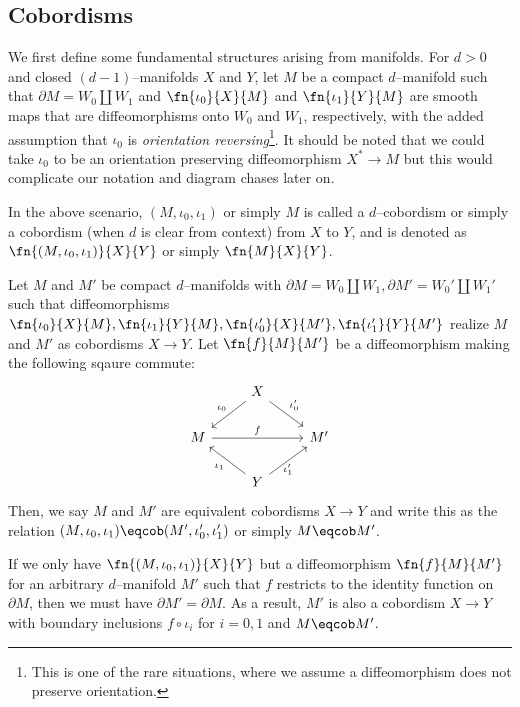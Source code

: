
\subsection{Cobordisms}

We first define some fundamental structures arising from manifolds. For $d > 0$
and closed $(d - 1)$--manifolds $X$ and $Y$, let $M$ be a compact $d$--manifold
such that $\partial M = W_0 \amalg W_1$ and $\fn{\iota_0}{X}{M}$ and
$\fn{\iota_1}{Y}{M}$ are smooth maps that are diffeomorphisms onto $W_0$ and
$W_1$, respectively, with the added assumption that $\iota_0$ is
\textit{orientation reversing}\footnote{This is one of the rare situations,
where we assume a diffeomorphism does not preserve orientation.}. It should be
noted that we could take $\iota_0$ to be an orientation preserving
diffeomorphism $X^* \to M$ but this would complicate our notation and diagram
chases later on.

\begin{defn}[{$d$}--Cobordism]
In the above scenario, $(M, \iota_0, \iota_1)$ or simply $M$ is called a
$d$--cobordism or simply a cobordism (when $d$ is clear from context) from $X$
to $Y$, and is denoted as $\fn{(M, \iota_0, \iota_1)}{X}{Y}$ or simply
$\fn{M}{X}{Y}$.
\end{defn}

\begin{defn}\label{cob:equiv}
Let $M$ and $M'$ be compact $d$--manifolds with $\partial M = W_0 \amalg W_1,
\partial M' = W_0' \amalg W_1'$ such that diffeomorphisms
$\fn{\iota_0}{X}{M}, \fn{\iota_1}{Y}{M}, \fn{\iota_0'}{X}{M'},
\fn{\iota_1'}{Y}{M'}$ realize $M$ and $M'$ as cobordisms $X \to Y$. Let
$\fn{f}{M}{M'}$ be a diffeomorphism making the following sqaure commute:
\[\begin{tikzcd}
  & X \arrow{dl}[above, xshift=-5pt]{\iota_0} \arrow[dr, "\iota_0'"] & \\
  M \arrow[rr, "f"] & & M'\\
  & Y \arrow[ul, "\iota_1"] \arrow[ur, "\iota_1'" below] &
\end{tikzcd}\]
Then, we say $M$ and $M'$ are equivalent cobordisms $X \to Y$ and write this as
the relation $(M, \iota_0, \iota_1) \eqcob (M', \iota_0', \iota_1')$
or simply $M \eqcob M'$.
\end{defn}

\begin{rmk}
If we only have $\fn{(M, \iota_0, \iota_1)}{X}{Y}$ but a diffeomorphism
$\fn{f}{M}{M'}$ for an arbitrary $d$--manifold $M'$ such that $f$ restricts to
the identity function on $\partial M$, then we must have
$\partial M' = \partial M$. As a result, $M'$ is also a cobordism $X \to Y$
with boundary inclusions $f \circ \iota_i$ for $i = 0, 1$ and $M \eqcob M'$.
\end{rmk}

